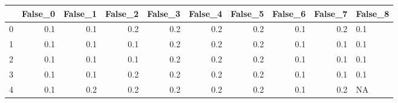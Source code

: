 \begin{tabular}{lrrrrrrrrl}
\toprule
{} &  False\_0 &  False\_1 &  False\_2 &  False\_3 &  False\_4 &  False\_5 &  False\_6 &  False\_7 & False\_8 \\ \hline
\midrule
0 &      0.1 &      0.1 &      0.2 &      0.2 &      0.2 &      0.2 &      0.1 &      0.2 &     0.1 \\ \hline
1 &      0.1 &      0.1 &      0.1 &      0.2 &      0.2 &      0.2 &      0.1 &      0.1 &     0.1 \\ \hline
2 &      0.1 &      0.1 &      0.1 &      0.2 &      0.2 &      0.2 &      0.1 &      0.1 &     0.1 \\ \hline
3 &      0.1 &      0.1 &      0.2 &      0.2 &      0.2 &      0.2 &      0.1 &      0.1 &     0.1 \\ \hline
4 &      0.1 &      0.2 &      0.2 &      0.2 &      0.2 &      0.2 &      0.1 &      0.2 &      NA \\ \hline
\bottomrule
\end{tabular}
